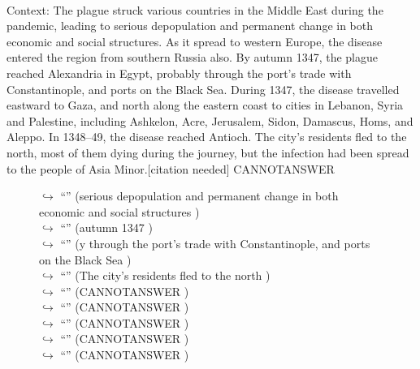 \documentclass[11pt,a4paper, onecolumn]{article}
\begin{document}
\\ Context: The plague struck various countries in the Middle East during the pandemic, leading to serious depopulation and permanent change in both economic and social structures. As it spread to western Europe, the disease entered the region from southern Russia also. By autumn 1347, the plague reached Alexandria in Egypt, probably through the port's trade with Constantinople, and ports on the Black Sea. During 1347, the disease travelled eastward to Gaza, and north along the eastern coast to cities in Lebanon, Syria and Palestine, including Ashkelon, Acre, Jerusalem, Sidon, Damascus, Homs, and Aleppo. In 1348–49, the disease reached Antioch. The city's residents fled to the north, most of them dying during the journey, but the infection had been spread to the people of Asia Minor.[citation needed] CANNOTANSWER

\begin{figure}[t] \small \begin{tcolorbox}[boxsep=0pt,left=5pt,right=0pt,top=2pt,colback = yellow!5] \begin{dialogue}
 \small 
\colorbox{pink!25}{$\hookrightarrow$}
{ ``'' (serious depopulation and permanent change in both economic and social structures ) }
\\
\colorbox{pink!25}{$\hookrightarrow$}
{ ``'' (autumn 1347 ) }
\\
\colorbox{pink!25}{$\hookrightarrow$}
{ ``'' (y through the port's trade with Constantinople, and ports on the Black Sea ) }
\\
\colorbox{pink!25}{$\hookrightarrow$}
{ ``'' (The city's residents fled to the north ) }
\\
\colorbox{pink!25}{$\hookrightarrow$}
{ ``'' (CANNOTANSWER ) }
\\
\colorbox{pink!25}{$\hookrightarrow$}
{ ``'' (CANNOTANSWER ) }
\\
\colorbox{pink!25}{$\hookrightarrow$}
{ ``'' (CANNOTANSWER ) }
\\
\colorbox{pink!25}{$\hookrightarrow$}
{ ``'' (CANNOTANSWER ) }
\\
\colorbox{pink!25}{$\hookrightarrow$}
{ ``'' (CANNOTANSWER ) }
\\
 \end{dialogue}\end{tcolorbox}\end{figure}
\end{document}
